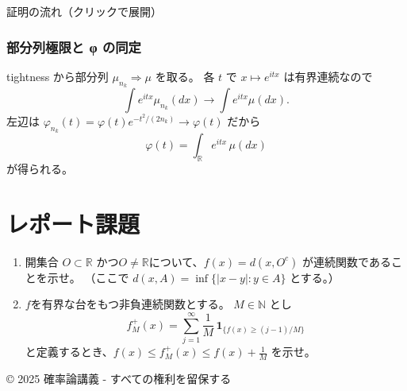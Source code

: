 \documentclass[uplatex,dvipdfmx,11pt,a4paper,openany]{bxjsbook}
\begin{document}
\begin{detailblock}{証明の流れ（クリックで展開）}
\subsubsection{部分列極限と φ の同定}
tightness から部分列 $\mu_{n_k}\Rightarrow\mu$ を取る。
            各 $t$ で $x\mapsto e^{itx}$ は有界連続なので
            \[\int e^{itx}\mu_{n_k}(dx)\to \int e^{itx}\mu(dx).\]
            左辺は $\varphi_{n_k}(t)=\varphi(t)e^{-t^2/(2n_k)}\to\varphi(t)$ だから
            \[\varphi(t)=\int_{\mathbb R} e^{itx}\,\mu(dx)\]
            が得られる。


\end{detailblock}

\section{レポート課題}
\begin{enumerate}
\item 開集合 $O\subset \mathbb R$ かつ$O\neq \mathbb R$について、$f(x)=d(x,O^c)$ が連続関数であることを示せ。
	        （ここで $d(x,A)=\inf\{|x-y|:y\in A\}$ とする。）
\item $f$を有界な台をもつ非負連続関数とする。  $M\in\mathbb N$ とし
	        \[f_M^+(x)=\sum_{j=1}^{\infty}\frac{1}{M}\,\mathbf 1_{\{f(x)\geq (j-1)/M\}}\]
	        と定義するとき、$f(x)\le f_M^+(x)\le f(x)+\frac{1}{M}$ を示せ。
\end{enumerate}

© 2025 確率論講義 - すべての権利を留保する
\end{document}
